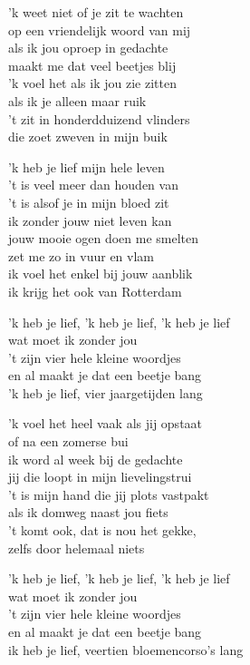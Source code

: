 
'k weet niet of je zit te wachten\\
op een vriendelijk woord van mij\\
als ik jou oproep in gedachte\\
maakt me dat veel beetjes blij\\
'k voel het als ik jou zie zitten\\
als ik je alleen maar ruik\\
't zit in honderdduizend vlinders\\
die zoet zweven in mijn buik

'k heb je lief mijn hele leven\\
't is veel meer dan houden van\\
't is alsof je in mijn bloed zit\\
ik zonder jouw niet leven kan\\
jouw mooie ogen doen me smelten\\
zet me zo in vuur en vlam\\
ik voel het enkel bij jouw aanblik\\
ik krijg het ook van Rotterdam

'k heb je lief, 'k heb je lief, 'k heb je lief\\
wat moet ik zonder jou\\
't zijn vier hele kleine woordjes\\
en al maakt je dat een beetje bang\\
'k heb je lief, vier jaargetijden lang

'k voel het heel vaak als jij opstaat\\
of na een zomerse bui\\
ik word al week bij de gedachte\\
jij die loopt in mijn lievelingstrui\\
't is mijn hand die jij plots vastpakt\\
als ik domweg naast jou fiets\\
't komt ook, dat is nou het gekke,\\
zelfs door helemaal niets

'k heb je lief, 'k heb je lief, 'k heb je lief\\
wat moet ik zonder jou\\
't zijn vier hele kleine woordjes\\
en al maakt je dat een beetje bang\\
ik heb je lief, veertien bloemencorso's lang

